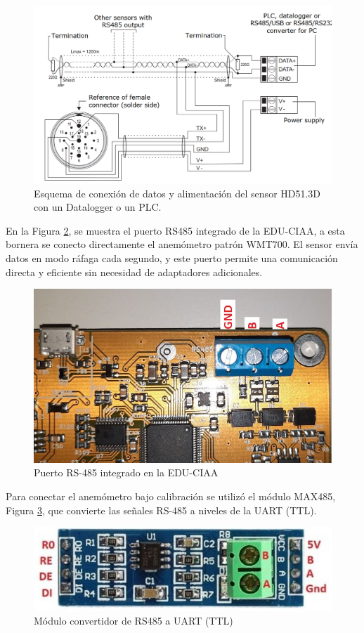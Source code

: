 \begin{figure}[H]
    \centering
    \includegraphics[width=0.8\linewidth]{Figuras/datalogger/Hardware/rs485DeltaOhm.png}
    \caption{Esquema de conexión de datos y alimentación del sensor HD51.3D con un Datalogger o un PLC.  \cite{DeltaOHM_HD51.3D_manual}}
    \label{fig:rs485DeltaOhm}
\end{figure}
En la Figura \ref{fig:rs485CIAA}, se muestra el puerto RS485 integrado de la EDU-CIAA, a esta bornera se conecto directamente el anemómetro patrón WMT700. El sensor envía datos en modo ráfaga cada segundo, y este puerto permite una comunicación directa y eficiente sin necesidad de adaptadores adicionales.
\begin{figure}[H]
    \centering
    \includegraphics[width=0.45\linewidth]{Figuras/datalogger/Hardware/rs485CIAA.jpg}
    \caption{Puerto RS-485 integrado en la EDU-CIAA}
    \label{fig:rs485CIAA}
\end{figure}

Para conectar el anemómetro bajo calibración se utilizó el módulo MAX485, Figura \ref{fig:moduleMax485}, que convierte las señales RS-485 a niveles de la UART (TTL). 
\begin{figure}[H]
    \centering
    \includegraphics[width=0.5\linewidth]{Figuras/datalogger/Hardware/moduleMax485.png}
    \caption{Módulo convertidor de RS485 a UART (TTL)}
    \label{fig:moduleMax485}
\end{figure}


